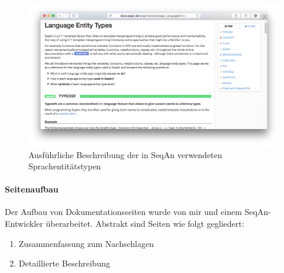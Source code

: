 \begin{figure}[ht!]
  \centering
    \includegraphics[width=0.9\linewidth]{Figures/dox/let-detail.png}
    \caption{Ausführliche Beschreibung der in SeqAn verwendeten Sprachentitätstypen}
    \label{fig:dox-let-detail}
\end{figure}



\paragraph{Seitenaufbau}

Der Aufbau von Dokumentationsseiten wurde von mir und einem SeqAn-Entwickler überarbeitet. Abstrakt sind Seiten wie folgt gegliedert:
\begin{enumerate}
\itemsep1pt\parskip0pt
  \item Zusammenfassung zum Nachschlagen
  \item Detaillierte Beschreibung
\end{enumerate}

